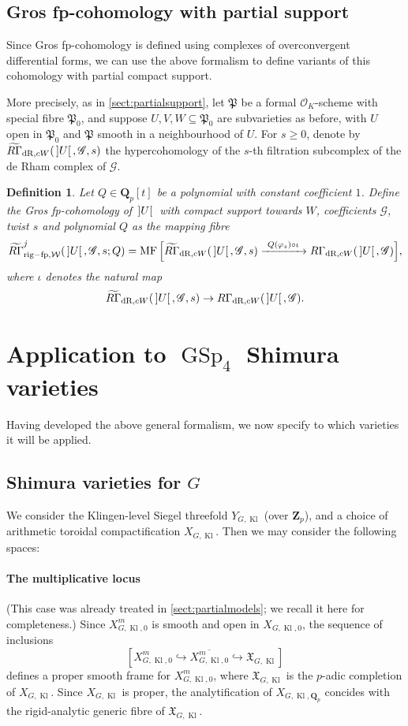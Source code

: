\documentclass[cjm]{ipart}
\theoremstyle{plain}
\newtheorem{definition}[theorem]{Definition}
\theoremstyle{remark}
\DeclareMathOperator{\GSp}{GSp}
\DeclareMathOperator{\Kl}{Kl}
\DeclareMathOperator{\MF}{MF}
\DeclareMathOperator{\rigfp}{rig-fp}
\DeclarePairedDelimiter{\tb}{{\,]}}{{[\, }} %
\newcommand{\QQ}{\mathbf{Q}}
\newcommand{\Qp}{\QQ_p}
\newcommand{\RGt}{\widetilde{R\Gamma}}
\newcommand{\Zp}{\mathbf{Z}_p}
\newcommand{\cO}{\mathcal{O}}
\newcommand{\cW}{\mathcal{W}}
\newcommand{\dR}{\mathrm{dR}}
\newcommand{\fP}{\mathfrak{P}}
\newcommand{\into}{\hookrightarrow}
\newcommand{\sG}{\mathscr{G}}
\numberwithin{equation}{subsection}
\renewcommand{\geq}{\geqslant}
\begin{document}
  \subsection{Gros fp-cohomology with partial support}

   Since Gros fp-cohomology is defined using complexes of overconvergent differential forms, we can use the above formalism to define variants of this cohomology with partial compact support.

   More precisely, as in \cref{sect:partialsupport}, let $\fP$ be a formal $\cO_K$-scheme with special fibre $\fP_0$, and suppose $U, V, W \subseteq \fP_0$ are subvarieties as before, with $U$ open in $\fP_0$ and $\fP$ smooth in a neighbourhood of $U$. For $s\geq 0$, denote by $\RGt_{\dR,cW}(\tb{U},\sG,s)$ the hypercohomology of the $s$-th filtration subcomplex of the de Rham complex of $\sG$.

   \begin{definition}
    Let $Q\in\Qp[t]$ be a polynomial with constant coefficient $1$. Define the Gros fp-cohomology of $\tb{U}$ with compact support towards $W$, coefficients $\sG$, twist $s$ and polynomial $Q$ as the mapping fibre
    \[   \RGt^j_{\rigfp,\cW}(\tb{U},\sG,s;Q)=\MF\Big[ \RGt_{\dR,cW}(\tb{U},\sG,s)\xrightarrow{\ Q(\varphi_s) \circ \iota\ } R\Gamma_{\dR,cW}(\tb{U},\sG)\Big],\]
    where $\iota$ denotes the natural map
    \[ \RGt_{\dR,cW}(\tb{U},\sG,s)\to R\Gamma_{\dR,cW}(\tb{U},\sG).\]
   \end{definition}

 \section{Application to \texorpdfstring{$\GSp_4$}{GSp(4)} Shimura varieties}

  Having developed the above general formalism, we now specify to which varieties it will be applied.

  \subsection{Shimura varieties for $G$} We consider the Klingen-level Siegel threefold $Y_{G, \Kl}$ (over $\Zp$), and a choice of arithmetic toroidal compactification $X_{G, \Kl}$. Then we may consider the following spaces:

  \paragraph*{The multiplicative locus} (This case was already treated in \cref{sect:partialmodels}; we recall it here for completeness.) Since $X_{G, \Kl, 0}^m$ is smooth and open in $X_{G, \Kl, 0}$, the sequence of inclusions
   \[ \left[ X_{G, \Kl, 0}^m \into \overline{X_{G, \Kl, 0}^m} \into \mathfrak{X}_{G, \Kl} \right] \]
   defines a proper smooth frame for $X_{G, \Kl, 0}^m$, where $\mathfrak{X}_{G, \Kl}$ is the $p$-adic completion of $X_{G, \Kl}$. Since $X_{G, \Kl}$ is proper, the analytification of $X_{G, \Kl, \Qp}$ concides with the rigid-analytic generic fibre of $\mathfrak{X}_{G, \Kl}$.
\end{document}
